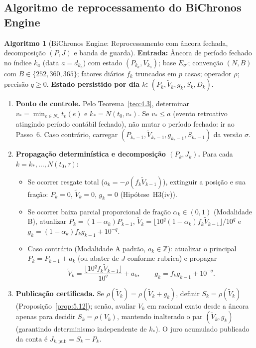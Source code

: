 \documentclass[11pt, a4paper]{article}
\theoremstyle{definition}
\newtheorem{algoritmo}[definicao]{Algoritmo}
\theoremstyle{plain}
\theoremstyle{remark}
\begin{document}
\subsection{Algoritmo de reprocessamento do BiChronos Engine}\label{sec:5.6}

\begin{algoritmo}[BiChronos Engine: Reprocessamento com âncora fechada, decomposição $(P, J)$ e banda de guarda]\label{alg:5.13}
\textbf{Entrada:} Âncora de período fechado no índice $k_a$ (data $a = d_{k_a}$) com estado $(P_{k_a}, V_{k_a})$; base $E_{\sigma'}$; convenção $(N, B)$ com $B \in \{252, 360, 365\}$; fatores diários $f_k$ truncados em $p$ casas; operador $\rho$; precisão $q \ge 0$. \textbf{Estado persistido por dia $k$:} $(P_k, \tilde{V}_k, g_k, S_k, D_k)$.
\begin{enumerate}[label=\textbf{\arabic*.}]
    \item \textbf{Ponto de controle.} Pelo Teorema~\ref{teo:4.3}, determinar $v_* = \min_{e \in N_\tau} t_v(e)$ e $k_* = N(t_0, v_*)$. Se $v_* \le a$ (evento retroativo atingindo período contábil fechado), não mutar o período fechado: ir ao Passo~6. Caso contrário, carregar $(P_{k_* - 1}, \tilde{V}_{k_* - 1}, g_{k_* - 1}, S_{k_* - 1})$ da versão $\sigma$.
    \item \textbf{Propagação determinística e decomposição $(P_k, J_k)$.} Para cada $k = k_*, \dots, N(t_0, \tau)$:
    \begin{itemize}
        \item Se ocorrer resgate total ($a_k = -\rho(f_k \tilde{V}_{k-1})$), extinguir a posição e sua fração: $P_k = 0$, $\tilde{V}_k = 0$, $g_k = 0$ (Hipótese~H3(iv)).
        \item Se ocorrer baixa parcial proporcional de fração $\alpha_k \in (0, 1)$ (Modalidade B), atualizar $P_k = (1 - \alpha_k)P_{k-1}$, $\tilde{V}_k = \lfloor 10^q (1 - \alpha_k) f_k \tilde{V}_{k-1} \rfloor / 10^q$ e $g_k = (1 - \alpha_k)f_k g_{k-1} + 10^{-q}$.
        \item Caso contrário (Modalidade A padrão, $a_k \in \mathbb{Z}$): atualizar o principal $P_k = P_{k-1} + a_k$ (ou abater de $J$ conforme rubrica) e propagar
        \[
        \tilde{V}_k = \frac{\lfloor 10^q f_k \tilde{V}_{k-1} \rfloor}{10^q} + a_k, \qquad g_k = f_k g_{k-1} + 10^{-q}.
        \]
    \end{itemize}
    \item \textbf{Publicação certificada.} Se $\rho(\tilde{V}_k) = \rho(\tilde{V}_k + g_k)$, definir $S_k = \rho(\tilde{V}_k)$ (Proposição~\ref{prop:5.12}); senão, avaliar $V_k$ em racional exato desde a âncora apenas para decidir $S_k = \rho(V_k)$, mantendo inalterado o par $(\tilde{V}_k, g_k)$ (garantindo determinismo independente de $k_*$). O juro acumulado publicado da conta é $J_{k,\text{pub}} = S_k - P_k$.

\end{enumerate}
\end{algoritmo}
\end{document}
